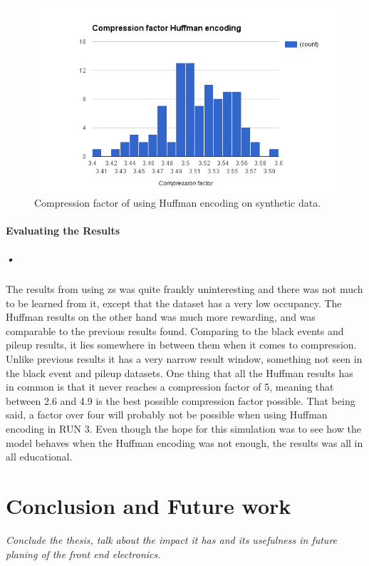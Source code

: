 \documentclass[a4paper, 12pt]{report}\dfrac{\right }{•}
\begin{document}
\begin{figure}[h!]
	\centering
		\includegraphics[width=1.0\textwidth]{images/huffman-comp-fake-pileup.png}
		\caption{Compression factor of using Huffman encoding on synthetic data.}
		\label{fig:compression-factor-huffman-synt}
\end{figure}

\subsubsection{Evaluating the Results}

\paragraph{•}
The results from using \gls{zs} was quite frankly uninteresting and there was not much to be learned from it, except that the dataset has a very low occupancy.
The Huffman results on the other hand was much more rewarding, and was comparable to the previous results found.
Comparing to the black events and pileup results, it lies somewhere in between them when it comes to compression.
Unlike previous results it has a very narrow result window, something not seen in the black event and pileup datasets.
One thing that all the Huffman results has in common is that it never reaches a compression factor of 5, meaning that between 2.6 and 4.9 is the best possible compression factor possible.
That being said, a factor over four will probably not be possible when using Huffman encoding in RUN 3.
Even though the hope for this simulation was to see how the model behaves when the Huffman encoding was not enough, the results was all in all educational.

\chapter{Conclusion and Future work}
\textit{Conclude the thesis, talk about the impact it has and its usefulness in future planing of the front end electronics.}
\end{document}
